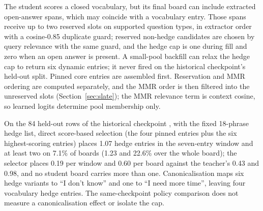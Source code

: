 The student scores a closed vocabulary, but its final board can include extracted open-answer spans, which may coincide with a vocabulary entry. Those spans receive up to two reserved slots on supported question types, in extractor order with a cosine-0.85 duplicate guard; reserved non-hedge candidates are chosen by query relevance with the same guard, and the hedge cap is one during fill and zero when an open answer is present. A small-pool backfill can relax the hedge cap to return six dynamic entries; it never fired on the historical checkpoint's held-out split. %
Pinned core entries are assembled first. Reservation and MMR ordering are computed separately, and the MMR order is then filtered into the unreserved slots (Section~\ref{sec:slate}); the MMR relevance term is context cosine, so learned logits determine pool membership only.

On the 84 held-out rows of the historical checkpoint , with the fixed 18-phrase hedge list, direct score-based selection (the four pinned entries plus the six highest-scoring entries) places 1.07 hedge entries in the seven-entry window and at least two on 7.1\% of boards (1.23 and 22.6\% over the whole board); the selector places 0.19 per window and 0.60 per board against the teacher's 0.43 and 0.98, and no student board carries more than one. %
Canonicalisation maps six hedge variants to ``I don't know'' and one to ``I need more time'', leaving four vocabulary hedge entries. The same-checkpoint policy comparison does not measure a canonicalisation effect or isolate the cap. %

